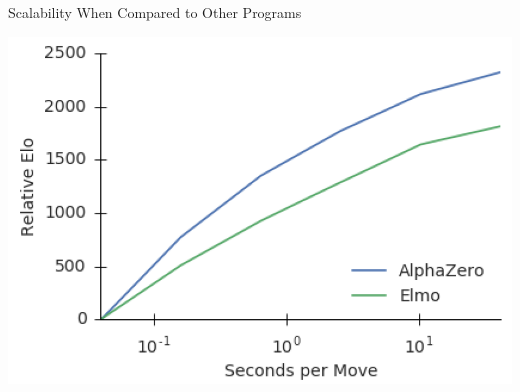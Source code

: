 \documentclass{beamer}
\begin{document}
{\begin{frame}{Scalability When Compared to Other Programs}
\begin{center}
        \pause
        \includegraphics[height=.45\textheight]{../img/AlphaZero-paper/scalability-against-elmo.png}
      \end{center}
    \end{frame}
  }
\end{document}
